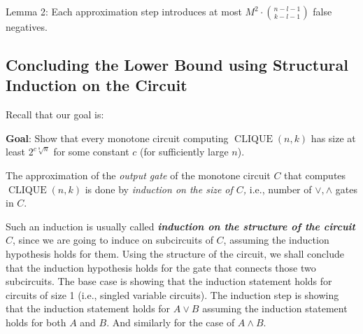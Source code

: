 Lemma 2: Each approximation step introduces at most $M^2 \cdot\binom{n-l-1}{k-l-1}$ false negatives.



\begin{tcolorbox}[colframe=white, colback=red!4, boxrule=0mm, sharp corners]
\begin{lemma}[Approximating ]
\label{lem:}

\end{lemma}
\end{tcolorbox}


\subsection{Concluding the Lower Bound using Structural Induction on the Circuit   }



Recall that our goal is:

\begin{tcolorbox}[colframe=white, colback=blue!1, boxrule=0mm, sharp corners]
\textbf{Goal}: Show that every monotone circuit computing $\operatorname{CLIQUE}(n,k)$ has size at least $2^{c \sqrt[8]{n}}$ for some constant $c$ (for sufficiently large $n$).
\end{tcolorbox}



The approximation of the \emph{output gate} of the monotone circuit $C$ that computes $\operatorname{CLIQUE}(n, k)$ is done by\emph{ induction on the size of $C$,} i.e., number of $\lor, \wedge$ gates in $C$.


\begin{tcolorbox}[colframe=white, colback=blue!11, boxrule=0mm, sharp corners]
\begin{note} Such an induction is usually called \emph{\textbf{induction on the structure of the circuit} $C$}, since we are going to induce on subcircuits of $C$, assuming the induction hypothesis holds for them. Using the structure of the circuit, we shall conclude that the induction hypothesis  holds for the gate that connects those two subcircuits. The base case is showing that the induction statement holds for circuits of size 1 (i.e., singled variable circuits). The induction step is showing that the induction statement holds for $A\lor B$ assuming the induction statement holds for both $A$ and $B$. And similarly for the case of $A\land B$.     
\end{note}
\end{tcolorbox}

